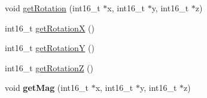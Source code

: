 \begin{DoxyCompactItemize}
\item 
void \hyperlink{class_m_p_u6050_a8ca85b87e7e0230921062fce7889b0d1}{get\+Rotation} (int16\+\_\+t $\ast$x, int16\+\_\+t $\ast$y, int16\+\_\+t $\ast$z)
\item 
int16\+\_\+t \hyperlink{class_m_p_u6050_a268f52843a24992ff06a3f12392de584}{get\+Rotation\+X} ()
\item 
int16\+\_\+t \hyperlink{class_m_p_u6050_a97cbe7f10dd27e07bd78d1c25e4286b5}{get\+Rotation\+Y} ()
\item 
int16\+\_\+t \hyperlink{class_m_p_u6050_ae0fee1ba996a2b6f914df6fc34e7da48}{get\+Rotation\+Z} ()
\item 
\hypertarget{class_m_p_u6050_a3d7871bb7016c0b8fde628b94b4e0e66}{void {\bfseries get\+Mag} (int16\+\_\+t $\ast$x, int16\+\_\+t $\ast$y, int16\+\_\+t $\ast$z)}\label{class_m_p_u6050_a3d7871bb7016c0b8fde628b94b4e0e66}


\end{DoxyCompactItemize}
